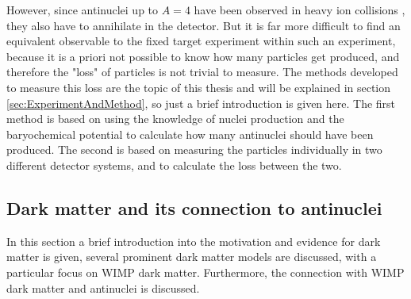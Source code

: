 However, since antinuclei up to $A=4$ have been observed in heavy ion collisions \cite{4He_PbPb}, they also have to annihilate in the detector. But it is far more difficult to find an equivalent observable to the fixed target experiment within such an experiment, because it is a priori not possible to know how many particles get produced, and therefore the "loss" of particles is not trivial to measure. The methods developed to measure this loss are the topic of this thesis and will be explained in section \ref{sec:ExperimentAndMethod}, so just a brief introduction is given here. The first method is based on using the knowledge of nuclei production and the baryochemical potential to calculate how many antinuclei should have been produced. The second is based on measuring the particles individually in two different detector systems, and to calculate the loss between the two. 

\subsection{Dark matter and its connection to antinuclei}
In this section a brief introduction into the motivation and evidence for dark matter is given, several prominent dark matter models are discussed, with a particular focus on WIMP dark matter. Furthermore, the connection with WIMP dark matter and antinuclei is discussed. 
